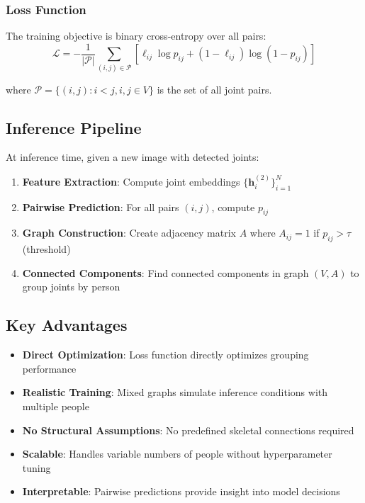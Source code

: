 \subsubsection{Loss Function}
The training objective is binary cross-entropy over all pairs:
\begin{equation}
\mathcal{L} = -\frac{1}{|\mathcal{P}|} \sum_{(i,j) \in \mathcal{P}} \left[ \ell_{ij} \log p_{ij} + (1-\ell_{ij}) \log(1-p_{ij}) \right]
\end{equation}

where $\mathcal{P} = \{(i,j) : i < j, i,j \in V\}$ is the set of all joint pairs.

\subsection{Inference Pipeline}

At inference time, given a new image with detected joints:

\begin{enumerate}
\item \textbf{Feature Extraction}: Compute joint embeddings $\{\mathbf{h}_i^{(2)}\}_{i=1}^N$
\item \textbf{Pairwise Prediction}: For all pairs $(i,j)$, compute $p_{ij}$
\item \textbf{Graph Construction}: Create adjacency matrix $A$ where $A_{ij} = 1$ if $p_{ij} > \tau$ (threshold)
\item \textbf{Connected Components}: Find connected components in graph $(V, A)$ to group joints by person
\end{enumerate}

\subsection{Key Advantages}

\begin{itemize}
\item \textbf{Direct Optimization}: Loss function directly optimizes grouping performance
\item \textbf{Realistic Training}: Mixed graphs simulate inference conditions with multiple people
\item \textbf{No Structural Assumptions}: No predefined skeletal connections required
\item \textbf{Scalable}: Handles variable numbers of people without hyperparameter tuning
\item \textbf{Interpretable}: Pairwise predictions provide insight into model decisions
\end{itemize}

